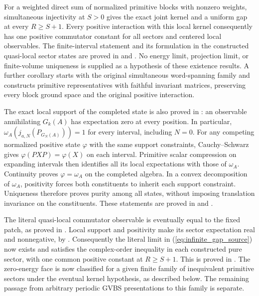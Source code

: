 \documentclass{article}
\begin{document}
For a weighted direct sum of normalized primitive blocks with nonzero
weights, simultaneous injectivity at $S>0$ gives the exact joint kernel
and a uniform gap at every $R\geq S+1$. Every positive interaction with
this local kernel consequently has one positive commutator constant for
all sectors and centered local observables. The finite-interval statement
and its formulation in the constructed quasi-local sector states are proved
in
 and
.
No energy limit, projection limit, or finite-volume uniqueness is supplied
as a hypothesis of these existence results. A further corollary starts with
the original simultaneous word-spanning family and constructs primitive
representatives with faithful invariant matrices, preserving every block
ground space and the original positive interaction.

The exact local support of the completed state is also proved in
:
an observable annihilating $G_k(A)$ has expectation zero at every position.
In particular, $\omega_A(j_{a,N}(P_{G_N(A)}))=1$ for every interval,
including $N=0$. For any competing normalized positive state $\varphi$
with the same support constraints, Cauchy--Schwarz gives
$\varphi(PXP)=\varphi(X)$ on each interval. Primitive scalar compression
on expanding intervals then identifies all its local expectations with those
of $\omega_A$. Continuity proves $\varphi=\omega_A$ on the completed
algebra. In a convex decomposition of $\omega_A$, positivity forces both
constituents to inherit each support constraint. Uniqueness therefore proves
purity among all states, without imposing translation invariance on the
constituents. These statements are proved in
 and
.

The literal quasi-local commutator observable is eventually equal to the
fixed patch, as proved in
.
Local support and positivity make its sector expectation real and
nonnegative, by
.
Consequently the literal limit in (\ref{eq:infinite_gap_source}) now exists
and satisfies the complex-order inequality in each constructed pure sector,
with one common positive constant at $R\geq S+1$. This is proved in
.
The zero-energy face is now classified for a given finite family of
inequivalent primitive sectors under the eventual kernel hypothesis,
as described below. The remaining passage from arbitrary periodic GVBS
presentations to this family is separate.
\end{document}

